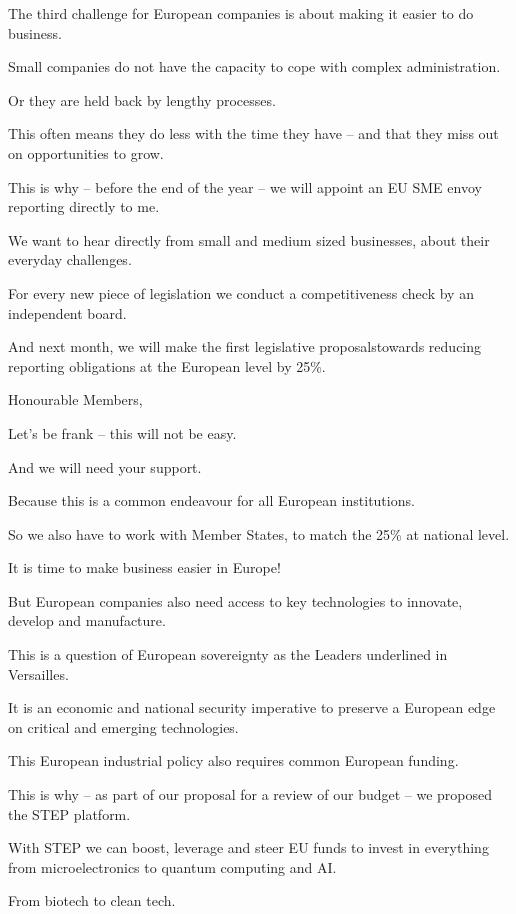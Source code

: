 \documentclass[a4paper,11pt]{article}
\begin{document}
 

The third challenge for European companies is about making it easier to do business. 

Small companies do not have the capacity to cope with complex administration.

Or they are held back by lengthy processes.

This often means they do less with the time they have – and that they miss out on opportunities to grow.

This is why – before the end of the year – we will appoint an EU SME envoy reporting directly to me.

We want to hear directly from small and medium sized businesses, about their everyday challenges.

For every new piece of legislation we conduct a competitiveness check by an independent board.

And next month, we will make the first legislative proposalstowards reducing reporting obligations at the European level by 25\%.

 

Honourable Members,

Let's be frank – this will not be easy.

And we will need your support.

Because this is a common endeavour for all European institutions.

So we also have to work with Member States, to match the 25\% at national level.

It is time to make business easier in Europe!

 

But European companies also need access to key technologies to innovate, develop and manufacture.

This is a question of European sovereignty as the Leaders underlined in Versailles.

It is an economic and national security imperative to preserve a European edge on critical and emerging technologies.

This European industrial policy also requires common European funding.

This is why – as part of our proposal for a review of our budget – we proposed the STEP platform.

With STEP we can boost, leverage and steer EU funds to invest in everything from microelectronics to quantum computing and AI. 

From biotech to clean tech. 
\end{document}

